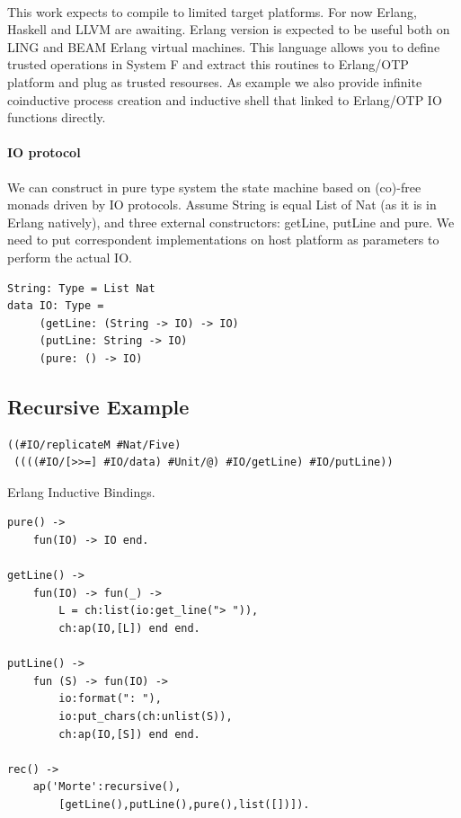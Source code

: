 \documentclass[11pt,oneside]{article}
\begin{document}
\paragraph{}
This work expects to compile to limited target platforms. For now Erlang, Haskell and LLVM are awaiting.
Erlang version is expected to be useful both on LING and BEAM Erlang virtual machines. This language
allows you to define trusted operations in System F and extract this routines to Erlang/OTP platform
and plug as trusted resourses. As example we also provide infinite coinductive process creation
and inductive shell that linked to Erlang/OTP IO functions directly.

\paragraph{IO protocol}
We can construct in pure type system the state machine based on (co)-free
monads driven by IO protocols. Assume String is equal List of Nat (as it is in Erlang natively),
and three external constructors: getLine, putLine and pure. We need to
put correspondent implementations on host platform as parameters to perform the actual IO.

\begin{lstlisting}[mathescape=true]
String: Type = List Nat
data IO: Type =
     (getLine: (String -> IO) -> IO)
     (putLine: String -> IO)
     (pure: () -> IO)
\end{lstlisting}

\subsection{Recursive Example}

\begin{lstlisting}[mathescape=true]
((#IO/replicateM #Nat/Five)
 ((((#IO/[>>=] #IO/data) #Unit/@) #IO/getLine) #IO/putLine))
\end{lstlisting}

Erlang Inductive Bindings.

\begin{lstlisting}[mathescape=true]
pure() ->
    fun(IO) -> IO end.

getLine() ->
    fun(IO) -> fun(_) ->
        L = ch:list(io:get_line("> ")),
        ch:ap(IO,[L]) end end.

putLine() ->
    fun (S) -> fun(IO) ->
        io:format(": "),
        io:put_chars(ch:unlist(S)),
        ch:ap(IO,[S]) end end.

rec() ->
    ap('Morte':recursive(),
        [getLine(),putLine(),pure(),list([])]).
\end{lstlisting}
\end{document}
